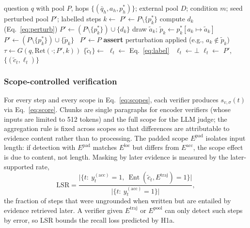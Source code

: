 \documentclass[conference]{IEEEtran}
\newcommand{\Eloc}{E^{\mathrm{loc}}}
\newcommand{\Eacc}{E^{\mathrm{acc}}}
\newcommand{\Etraj}{E^{\mathrm{traj}}}
\newcommand{\Epool}{E^{\mathrm{pool}}}
\newcommand{\Epad}{E^{\mathrm{pad}}}
\newcommand{\ctil}{\tilde{c}}
\newcommand{\Ent}{\operatorname{Ent}}
\begin{document}
\begin{algorithm}[t]
\caption{HLEP perturbation and label construction}\label{alg:hlep}
\begin{algorithmic}[1]
\Require question $q$ with pool $P$, hops $\{(\bar{q}_h,a_h,p_h^{*})\}$; external pool $D$; condition $m$; seed
\Ensure perturbed pool $P'$; labelled steps
\State $k \gets$  
 $P' \gets P\setminus\{p_k^{*}\}$
 compute $d_k$ (Eq.~\ref{eq:perturb})
\State $P' \gets (P\setminus\{p_k^{*}\})\cup\{d_k\}$
 draw $\tilde{a}_k$; $\tilde{p}_k \gets p_k^{*}[a_k\mapsto\tilde{a}_k]$
\State $P' \gets (P\setminus\{p_k^{*}\})\cup\{\tilde{p}_k\}$
\Else\ $P'\gets P$
\EndIf
\State \textbf{assert} perturbation applied (e.g., $a_k\notin\tilde{p}_k$)
\State $\tau \gets G(q, \mathrm{Ret}(\cdot;P',k))$
\State $\{\ctil_t\} \gets$ 
   $\ell_t \gets$ Eq.~\eqref{eq:label}
  \Else\ $\ell_t \gets \bot$
  \EndIf
   $\ell_t \gets$ \Call{Judge}{$\ctil_t$, $\Eacc_t$}
  \EndIf
\EndFor
\State \Return $P'$, $\{(\ctil_t,\ell_t)\}$
\end{algorithmic}
\end{algorithm}

\subsubsection{Scope-controlled verification}
For every step and every scope in Eq.~\eqref{eq:scopes}, each verifier produces $s_{v,\sigma}(t)$ via Eq.~\eqref{eq:score}. Chunks are single paragraphs for encoder verifiers (whose inputs are limited to 512 tokens) and the full scope for the LLM judge; the aggregation rule is fixed across scopes so that differences are attributable to evidence content rather than to processing. The padded scope $\Epad$ isolates input length: if detection with $\Epad$ matches $\Eloc$ but differs from $\Eacc$, the scope effect is due to content, not length. Masking by later evidence is measured by the later-supported rate,
\begin{equation}\label{eq:lsr}
\mathrm{LSR} = \frac{\big|\{t:\ y_t^{(\mathrm{acc})}=1,\ \Ent(\ctil_t,\Etraj)=1\}\big|}{\big|\{t:\ y_t^{(\mathrm{acc})}=1\}\big|},
\end{equation}
the fraction of steps that were ungrounded when written but are entailed by evidence retrieved later. A verifier given $\Etraj$ or $\Epool$ can only detect such steps by error, so LSR bounds the recall loss predicted by H1a.
\end{document}
